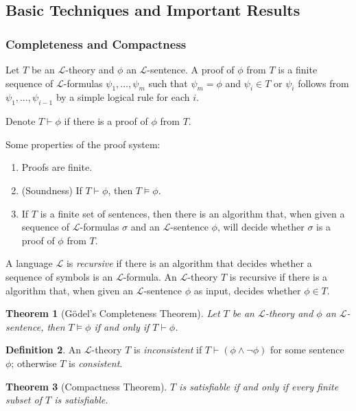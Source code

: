 \documentclass{amsart}
\newtheorem{theorem}{Theorem}[subsection]
\theoremstyle{definition}
\newtheorem{definition}[theorem]{Definition}
\numberwithin{equation}{section}
\begin{document}
\subsection{Basic Techniques and Important Results}
\subsubsection{Completeness and Compactness}
Let $T$ be an $\mathcal{L}$-theory and $\phi$ an $\mathcal{L}$-sentence.
A proof of $\phi$ from $T$ is a finite sequence of $\mathcal{L}$-formulas
$\psi_1,\dots,\psi_m$ such that $\psi_m = \phi$ and $\psi_i \in T$ or 
$\psi_i$ follows from $\psi_1,\dots,\psi_{i-1}$ by a simple logical rule for each $i$.

Denote $T \vdash \phi$ if there is a proof of $\phi$ from $T$.

Some properties of the proof system:
\begin{enumerate}[label = {$\bullet$}]
    \item Proofs are finite.
    \item (Soundness) If $T \vdash \phi$, then $T \models \phi$.
    \item If $T$ is a finite set of sentences, then there is an algorithm that,
      when given a sequence of $\mathcal{L}$-formulas $\sigma$ and an $\mathcal{L}$-sentence $\phi$,
      will decide whether $\sigma$ is a proof of $\phi$ from $T$.
\end{enumerate}

A language $\mathcal{L}$ is \emph{recursive} if there is an algorithm that
decides whether a sequence of symbols is an $\mathcal{L}$-formula.
An $\mathcal{L}$-theory $T$ is recursive if there is a algorithm that,
when given an $\mathcal{L}$-sentence $\phi$ as input, decides whether $\phi \in T$.

\begin{theorem}[G\"odel's Completeness Theorem]
    Let $T$ be an $\mathcal{L}$-theory and $\phi$ an $\mathcal{L}$-sentence, then $T \models \phi$ if and only if $T\vdash \phi$.
\end{theorem}

\begin{definition}
    An $\mathcal{L}$-theory $T$ is \emph{inconsistent} 
    if $T \vdash (\phi \land\neg\phi)$ for some sentence $\phi$;
    otherwise $T$ is \emph{consistent}.
\end{definition}

\begin{theorem}[Compactness Theorem]
    $T$ is satisfiable if and only if every finite subset of $T$ is satisfiable.
\end{theorem}
\end{document}

